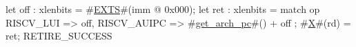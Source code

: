 let off : xlenbits = #\hyperref[sailRISCVzEXTS]{EXTS}#(imm @ 0x000);
let ret : xlenbits = match op {
  RISCV_LUI   => off,
  RISCV_AUIPC => #\hyperref[sailRISCVzgetzyarchzypc]{get\_arch\_pc}#() + off
};
#\hyperref[sailRISCVzX]{X}#(rd) = ret;
RETIRE_SUCCESS
